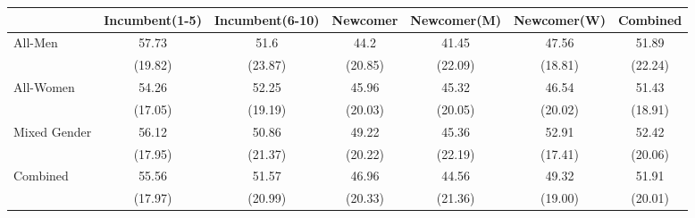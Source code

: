 \begin{tabular}{l*{6}{c}}
\toprule
                & Incumbent(1-5) &Incumbent(6-10) & Newcomer & Newcomer(M) & Newcomer(W) &    Combined \\
\midrule
All-Men      & 57.73 & 51.6 & 44.2  &    41.45&    47.56&    51.89\\
                &(19.82)&(23.87)&(20.85)&  (22.09)&  (18.81)&  (22.24)\\
\addlinespace
All-Women&   54.26&   52.25&   45.96 &    45.32&    46.54&    51.43\\
                & (17.05)& (19.19)& (20.03)&  (20.05)&  (20.02)&  (18.91)\\
\addlinespace
Mixed Gender     &    56.12&    50.86&    49.22&    45.36&    52.91&    52.42\\
                &   (17.95)&   (21.37)&   (20.22)&  (22.19)&  (17.41)&  (20.06)\\
\addlinespace
Combined &    55.56&    51.57  &  46.96&    44.56&    49.32&    51.91\\
                &  (17.97)&  (20.99)&  (20.33)&  (21.36)&  (19.00)&  (20.01)\\

\bottomrule
\end{tabular}
